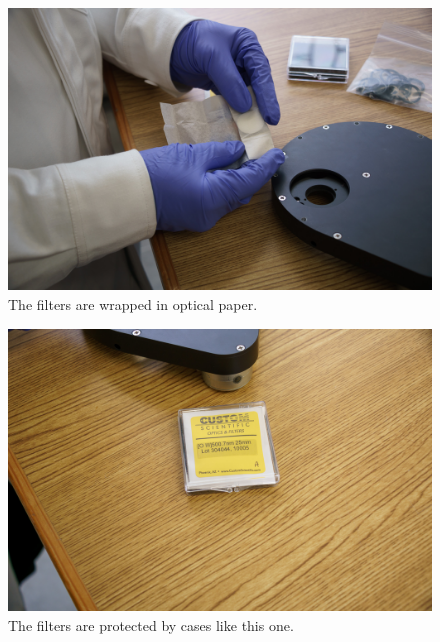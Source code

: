 \begin{figure}
\begin{center}
\includegraphics[width=0.8\linewidth]{figures/huitzi-f8-filter-paper.jpg}
\end{center}
\caption{The filters are wrapped in optical paper.}
\label{figure:huitzi-f8-filter-paper}
\end{figure}

\begin{figure}
\begin{center}
\includegraphics[width=0.8\linewidth]{figures/huitzi-f8-filter-case.jpg}
\end{center}
\caption{The filters are protected by cases like this one.}
\label{figure:huitzi-f8-filter-case}
\end{figure}

